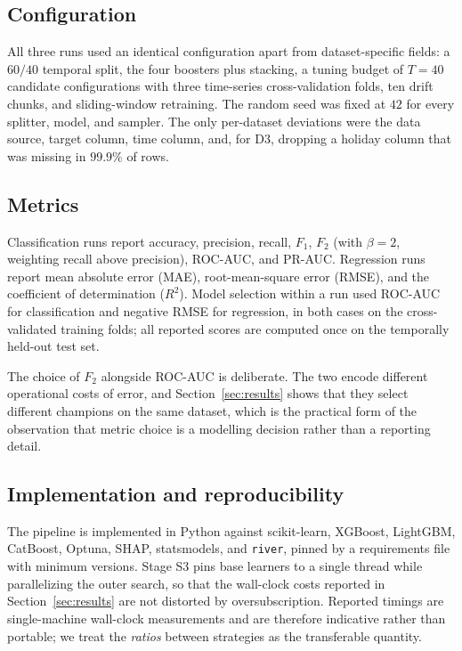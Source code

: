 \documentclass{ieeeaccess}
\begin{document}
\subsection{Configuration}
All three runs used an identical configuration apart from dataset-specific fields: a $60/40$ temporal split, the four boosters plus stacking, a tuning budget of $T=40$ candidate configurations with three time-series cross-validation folds, ten drift chunks, and sliding-window retraining. The random seed was fixed at $42$ for every splitter, model, and sampler. The only per-dataset deviations were the data source, target column, time column, and, for D3, dropping a holiday column that was missing in $99.9\%$ of rows.

\subsection{Metrics}
Classification runs report accuracy, precision, recall, $F_1$, $F_2$ (with $\beta = 2$, weighting recall above precision), ROC-AUC, and PR-AUC. Regression runs report mean absolute error (MAE), root-mean-square error (RMSE), and the coefficient of determination ($R^2$). Model selection within a run used ROC-AUC for classification and negative RMSE for regression, in both cases on the cross-validated training folds; all reported scores are computed once on the temporally held-out test set.

The choice of $F_2$ alongside ROC-AUC is deliberate. The two encode different operational costs of error, and Section~\ref{sec:results} shows that they select different champions on the same dataset, which is the practical form of the observation that metric choice is a modelling decision rather than a reporting detail.

\subsection{Implementation and reproducibility}
The pipeline is implemented in Python against scikit-learn, XGBoost, LightGBM, CatBoost, Optuna, SHAP, statsmodels, and \texttt{river}, pinned by a requirements file with minimum versions. Stage S3 pins base learners to a single thread while parallelizing the outer search, so that the wall-clock costs reported in Section~\ref{sec:results} are not distorted by oversubscription. Reported timings are single-machine wall-clock measurements and are therefore indicative rather than portable; we treat the \emph{ratios} between strategies as the transferable quantity.
\end{document}
